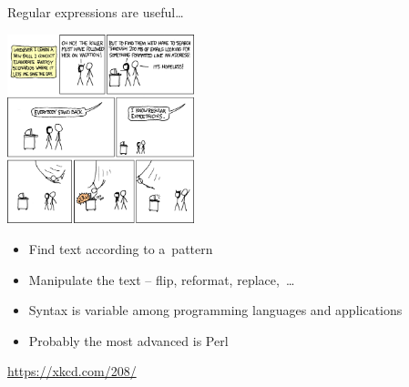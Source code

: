 \documentclass[compress, ucs, xelatex, 11pt, xcolor=svgnames,
  hyperref={
    bookmarks=true,
    unicode=true,
    colorlinks=true,
    pdftitle={Linux, command line and MetaCentrum},
    plainpages=false,
    pdfauthor={Vojtech Zeisek},
    pdfsubject={Course about use of Linux command line, writing shell scripts and using MetaCentrum of CESNET},
    pdfcreator={XeLaTeX},
    pdfkeywords={Linux, GNU, BASH, shell, command line, MetaCentrum},
    linkcolor=Red,
    anchorcolor=Blue,
    citecolor=Purple,
    filecolor=DodgerBlue,
    menucolor=DarkOrchid,
    urlcolor=DeepSkyBlue,
    pdftex},
  url={hyphens, lowtilde} %
  ]{beamer}
\begin{document}
\begin{frame}{Regular expressions are useful\ldots}
  \begin{multicols}{2}
    \begin{center}
      \includegraphics[height=5.5cm]{regular_expressions.png}
    \end{center}
    \columnbreak
    \begin{itemize}
      \item Find text according to a~pattern
      \item Manipulate the text -- flip, reformat, replace,~\ldots
      \item Syntax is variable among programming languages and applications
      \item Probably the most advanced is Perl
    \end{itemize}
    \vfill
    \url{https://xkcd.com/208/}
  \end{multicols}
\end{frame}
\end{document}
